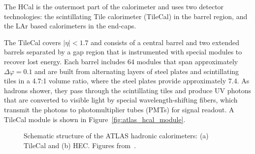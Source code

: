 
The HCal is the outermost part of the calorimeter and uses two detector technologies: the scintillating Tile calorimeter (TileCal) in the barrel region, and the LAr based calorimeters in the end-caps\@.

The TileCal covers $|\eta| < 1.7$ and consists of a central barrel and two extended barrels separated by a gap region that is instrumented with special modules to recover lost energy. Each barrel includes 64 modules that span approximately $\Delta\varphi = 0.1$ and are built from alternating layers of steel plates and scintillating tiles in a 4.7:1 volume ratio, where the steel plates provide approximately 7.4\intlength{}. As hadrons shower, they pass through the scintillating tiles and produce UV photons that are converted to visible light by special wavelength-shifting fibers, which transmit the photons to photomultiplier tubes (PMTs) for signal readout. A TileCal module is shown in Figure~\ref{fig:atlas_hcal_module}.

\begin{figure}[htp]
    \centering
    \hfill
    \caption{Schematic structure of the ATLAS hadronic calorimeters: (a) TileCal and (b) HEC\@. Figures from~\cite{atlas_collaboration_paper}.}\label{fig:atlas_hcal_combined}
\end{figure}

